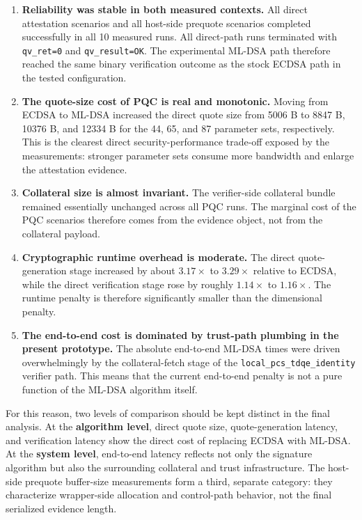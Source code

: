 \begin{enumerate}
  \item \textbf{Reliability was stable in both measured contexts.} All direct
        attestation scenarios and all host-side prequote scenarios completed
        successfully in all 10 measured runs. All direct-path runs terminated
        with \texttt{qv\_ret=0} and \texttt{qv\_result=OK}. The experimental
        ML-DSA path therefore reached the same binary verification outcome as
        the stock ECDSA path in the tested configuration.

  \item \textbf{The quote-size cost of PQC is real and monotonic.} Moving from ECDSA to ML-DSA increased the direct quote size from 5006 B to 8847 B, 10376 B, and 12334 B for the 44, 65, and 87 parameter sets, respectively. This is the clearest direct security-performance trade-off exposed by the measurements: stronger parameter sets consume more bandwidth and enlarge the attestation evidence.

  \item \textbf{Collateral size is almost invariant.} The verifier-side collateral bundle remained essentially unchanged across all PQC runs. The marginal cost of the PQC scenarios therefore comes from the evidence object, not from the collateral payload.

  \item \textbf{Cryptographic runtime overhead is moderate.} The direct
        quote-generation stage increased by about \(3.17\times\) to
        \(3.29\times\) relative to ECDSA, while the direct verification stage
        rose by roughly \(1.14\times\) to \(1.16\times\). The runtime penalty
        is therefore significantly smaller than the dimensional penalty.

  \item \textbf{The end-to-end cost is dominated by trust-path plumbing in the present prototype.} The absolute end-to-end ML-DSA times were driven overwhelmingly by the collateral-fetch stage of the \texttt{local\_pcs\_tdqe\_identity} verifier path. This means that the current end-to-end penalty is not a pure function of the ML-DSA algorithm itself.
\end{enumerate}

For this reason, two levels of comparison should be kept distinct in the final
analysis. At the \textbf{algorithm level}, direct quote size, quote-generation latency,
and verification latency show the direct cost of replacing ECDSA with
ML-DSA. At the \textbf{system level}, end-to-end latency reflects not only the
signature algorithm but also the surrounding collateral and trust
infrastructure. The host-side prequote buffer-size measurements form a third,
separate category: they characterize wrapper-side allocation and control-path
behavior, not the final serialized evidence length.

